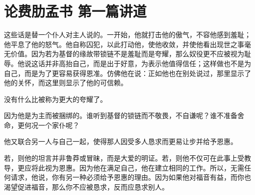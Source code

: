 

\section{论费肋孟书 第一篇讲道}

\par

\par

这些话是替一个仆人对主人说的。一开始，他就打击他的傲气，不容他感到羞耻；他平息了他的怒气。他自称囚犯，以此打动他，使他收敛，并使他看出现世之事毫无价值。因为若为基督的缘故带锁链不是羞耻而是夸耀，那么奴役更不应被视为耻辱。他说这话并非高抬自己，而是出于好意，为表示他值得信任；这样做也不是为自己，而是为了更容易获得恩准。仿佛他在说：正如他也在别处说过，那里显示了他的关怀，而这里则显示了他的可信赖。\par

没有什么比被称为更大的夸耀了。\par

因为他是为主而被捆绑的。谁听到基督的锁链而不敬畏，不自谦呢？谁不准备舍命，更何况一个家仆呢？\par

\par

他又联合另一人与自己一起，使得那人因受多人恳求而更易让步并给予恩惠。\par

\par

若，则他的坦言并非鲁莽或冒昧，而是大爱的明证。若，则他不仅可在此事上受教导，更应将此视为恩惠。因为他在满足自己，他在建立相同的工作。所以，无需任何请求，他说，你有另一种必须给予恩惠的理由。因为如果他对福音有益，而你也渴望促进福音，那么你不应被恳求，反而应恳求别人。\par

